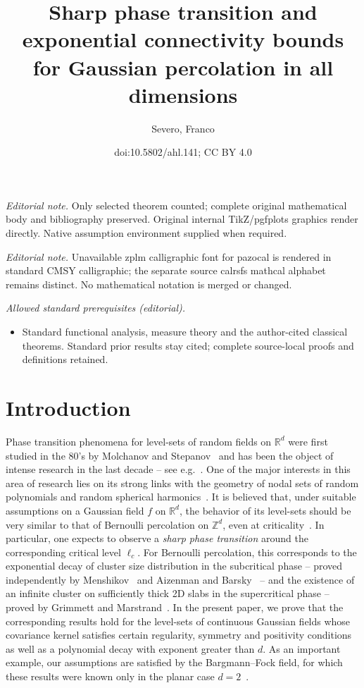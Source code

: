 \documentclass[10pt]{amsart}
\title{Sharp phase transition and exponential connectivity bounds for Gaussian percolation in all dimensions}
\author{Severo, Franco}
\date{doi:10.5802/ahl.141; CC BY 4.0}
\theoremstyle{definition}\newtheorem{defi}[theo]{Definition}\newtheorem{rema}[theo]{Remark}\newtheorem{exam}[theo]{Example}\newtheorem{exem}[theo]{Example}\newtheorem{nota}[theo]{Notation}
\newcommand{\R}{\mathbb{R}}
\newcommand{\Z}{\mathbb{Z}}
\begin{document}
\maketitle
\noindent\textit{Editorial note.} Only selected theorem counted; complete original mathematical body and bibliography preserved. Original internal TikZ/pgfplots graphics render directly. Native assumption environment supplied when required.\par\medskip
\noindent\textit{Editorial note.} Unavailable zplm calligraphic font for pazocal is rendered in standard CMSY calligraphic; the separate source calrsfs mathcal alphabet remains distinct. No mathematical notation is merged or changed.\par\medskip
\noindent\textit{Allowed standard prerequisites (editorial).}\begin{itemize}
\item Standard functional analysis, measure theory and the author-cited classical theorems. Standard prior results stay cited; complete source-local proofs and definitions retained.
\end{itemize}\medskip

\section{Introduction}\label{sec:intro}

Phase transition phenomena for level-sets of random fields on $\R^d$ were first studied in the 80's by Molchanov and Stepanov~\cite{MoSt83a, MoSt83b, MoSt86c} and has been the object of intense research in the last decade -- see e.g.~\cite{BG17, BM18,MV, MRV20,RVb}. One of the major interests in this area of research lies on its strong links with the geometry of nodal sets of random polynomials and random spherical harmonics~\cite{An16, NaSo09, CaSa19, Sa1, SaWi19}. It is believed that, under suitable assumptions on a Gaussian field $f$ on $\R^d$, the behavior of its level-sets should be very similar to that of Bernoulli percolation on $\Z^d$, even at criticality~\cite{BogSch02,BogSch07}. In particular, one expects to observe a \emph{sharp phase transition} around the corresponding critical level $\ell_c$. For Bernoulli percolation, this corresponds to the exponential decay of cluster size distribution in the subcritical phase -- proved independently by Menshikov~\cite{Men86} and Aizenman and Barsky~\cite{AizBar87} -- and the existence of an infinite cluster on sufficiently thick 2D slabs in the supercritical phase -- proved by Grimmett and Marstrand~\cite{GriMar90}. In the present paper, we prove that the corresponding results hold for the level-sets of continuous Gaussian fields whose covariance kernel satisfies certain regularity, symmetry and positivity conditions as well as a polynomial decay with exponent greater than $d$. As an important example, our assumptions are satisfied by the Bargmann--Fock field, for which these results were known only in the planar case $d=2$~\cite{RVb}.
\end{document}
